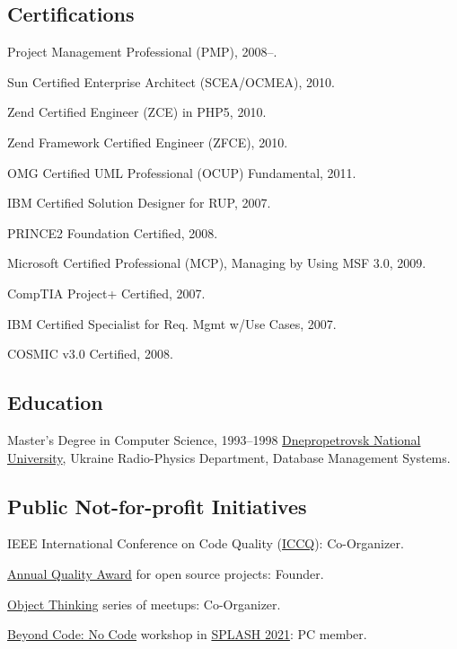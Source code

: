 \documentclass{yb}
\begin{document}
\subsection*{Certifications}

Project Management Professional (PMP), 2008--.

Sun Certified Enterprise Architect (SCEA/OCMEA), 2010.

Zend Certified Engineer (ZCE) in PHP5, 2010.

Zend Framework Certified Engineer (ZFCE), 2010.

OMG Certified UML Professional (OCUP) Fundamental, 2011.

IBM Certified Solution Designer for RUP, 2007.

PRINCE2 Foundation Certified, 2008.

Microsoft Certified Professional (MCP), Managing by Using MSF 3.0, 2009.

CompTIA Project+ Certified, 2007.

IBM Certified Specialist for Req. Mgmt w/Use Cases, 2007.

COSMIC v3.0 Certified, 2008.

\subsection*{Education}

\begin{samepage}
Master's Degree in Computer Science, 1993--1998\newline
\href{http://dnu.dp.ua/}{Dnepropetrovsk National University}, Ukraine\newline
Radio-Physics Department, Database Management Systems.
\end{samepage}

\subsection*{Public Not-for-profit Initiatives}

IEEE International Conference on Code Quality (\href{https://www.iccq.ru}{ICCQ}): Co-Organizer.

\href{https://www.yegor256.com/award.html}{Annual Quality Award} for open source projects: Founder.

\href{https://www.meetup.com/Object-Thinking/}{Object Thinking} series of meetups: Co-Organizer.

\href{https://2021.splashcon.org/home/bcnc-2021}{Beyond Code: No Code} workshop
  in \href{https://2021.splashcon.org/}{SPLASH 2021}: PC member.
\end{document}
